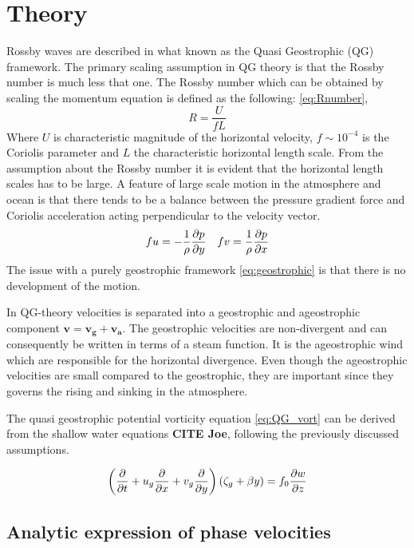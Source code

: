 \section{Theory}

Rossby waves are described in what known as the Quasi Geostrophic (QG)
framework. The primary scaling assumption in QG theory is that the Rossby number
is much less that one. The Rossby number which can be obtained by scaling the
momentum equation is defined as the following:
\cref{eq:Rnumber},
\begin{equation}\label{eq:Rnumber}
    R = \frac{U}{fL}
\end{equation}
Where $U$ is characteristic magnitude of the horizontal velocity, $f \sim 10^{-4}$
is the Coriolis parameter and $L$ the characteristic horizontal length scale.
From the assumption about the Rossby number it is evident that the horizontal
length scales has to be large. A feature of large scale motion in the atmosphere
and ocean is that there tends to be a balance between the pressure gradient
force and Coriolis acceleration acting perpendicular to the velocity vector.
\begin{equation}\label{eq:geostrophic}
    fu = -\frac{1}{\rho}\pdv{p}{y} \quad fv = \frac{1}{\rho}\pdv{p}{x}
\end{equation}
The issue with a purely geostrophic framework \cref{eq:geostrophic} is that
there is no development of the motion.

In QG-theory velocities is
separated into a geostrophic and ageostrophic component $\mathbf{v} = \mathbf
{v_g} +\mathbf{v_a}$. The geostrophic velocities are
non-divergent and can consequently be written in terms of a steam function.
It is the ageostrophic wind which are responsible for the
horizontal divergence. Even though the ageostrophic velocities
are small compared to the geostrophic, they are important since
they governs the rising and sinking in the atmosphere.

The quasi geostrophic potential vorticity equation \cref{eq:QG_vort} can be
derived from the shallow water equations \textbf{CITE Joe}, following the
previously discussed
assumptions.

\begin{equation}\label{eq:QG_vort}
    \left(\pdv{}{t}+u_g \pdv{}{x} + v_g \pdv{}{y} \right)(\zeta_g + \beta y) =
    f_0 \pdv{w}{z}
\end{equation}

\subsection{Analytic expression of phase velocities}

